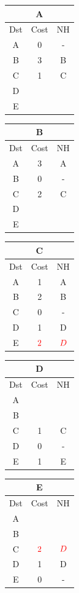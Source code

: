 \documentclass[10pt]{article}
\begin{document}
			\begin{table}[h!]
				\begin{tabular}{|c||c||c|}
					\hline
					\multicolumn{3}{|c|}{A} \\
					\hline
					Dst & Cost & NH \\
					\hline
					A & 0 & - \\
					B & 3 & B \\
					C & 1 & C \\
					D &   &   \\
					E &   &   \\
					\hline
				\end{tabular}
				\begin{tabular}{|c||c||c|}
					\hline
					\multicolumn{3}{|c|}{B} \\
					\hline
					Dst & Cost & NH \\
					\hline
					A & 3 & A \\
					B & 0 & - \\
					C & 2 & C \\
					D &   &   \\
					E &   &   \\
					\hline
				\end{tabular}
				\begin{tabular}{|c||c||c|}
					\hline
					\multicolumn{3}{|c|}{C} \\
					\hline
					Dst & Cost & NH \\
					\hline
					A & 1 & A \\
					B & 2 & B \\
					C & 0 & - \\
					D & 1 & D \\
					E & $\color{red} 2$ & $\color{red} D$ \\
					\hline
				\end{tabular}
				\begin{tabular}{|c||c||c|}
					\hline
					\multicolumn{3}{|c|}{D} \\
					\hline
					Dst & Cost & NH \\
					\hline
					A &   &   \\
					B &   &   \\
					C & 1 & C \\
					D & 0 & - \\
					E & 1 & E \\
					\hline
				\end{tabular}
				\begin{tabular}{|c||c||c|}
					\hline
					\multicolumn{3}{|c|}{E} \\
					\hline
					Dst & Cost & NH \\
					\hline
					A &   &   \\
					B &   &   \\
					C & $\color{red} 2$ & $\color{red} D$ \\
					D & 1 & D \\
					E & 0 & - \\
					\hline
				\end{tabular}
			\end{table}
\end{document}
